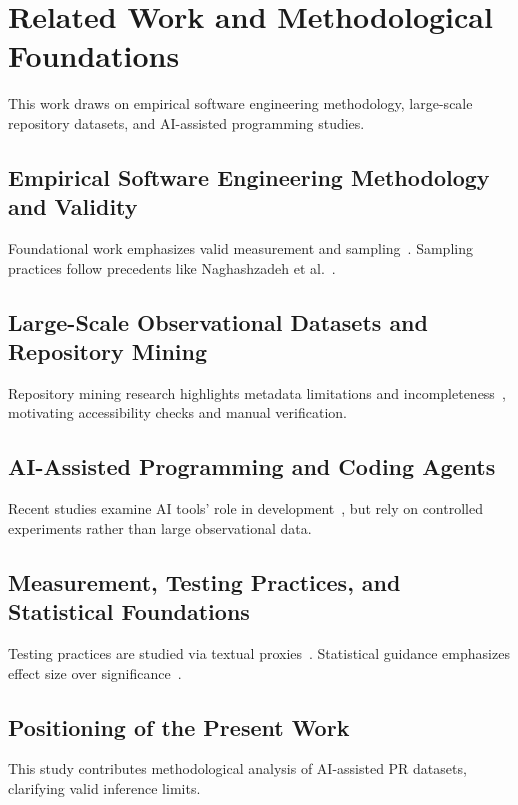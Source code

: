 \documentclass[conference]{IEEEtran}
\begin{document}
\section{Related Work and Methodological Foundations}

This work draws on empirical software engineering methodology, large-scale repository datasets, and AI-assisted programming studies.

\subsection{Empirical Software Engineering Methodology and Validity}
Foundational work emphasizes valid measurement and sampling~\cite{wohlin2012experimentation, kitchenham2002preliminary}. Sampling practices follow precedents like Naghashzadeh et al.~\cite{naghashzadeh2022developer}.

\subsection{Large-Scale Observational Datasets and Repository Mining}
Repository mining research highlights metadata limitations and incompleteness~\cite{baltes2018sotorrent, asaduzzaman2013answer}, motivating accessibility checks and manual verification.

\subsection{AI-Assisted Programming and Coding Agents}
Recent studies examine AI tools' role in development~\cite{vaithilingam2022expectation, finnie2022robots, chen2021evaluating}, but rely on controlled experiments rather than large observational data.

\subsection{Measurement, Testing Practices, and Statistical Foundations}
Testing practices are studied via textual proxies~\cite{calefato2018ask, mi2017empirical}. Statistical guidance emphasizes effect size over significance~\cite{cohen1988statistical, agresti2018introduction}.

\subsection{Positioning of the Present Work}
This study contributes methodological analysis of AI-assisted PR datasets, clarifying valid inference limits.
\end{document}
